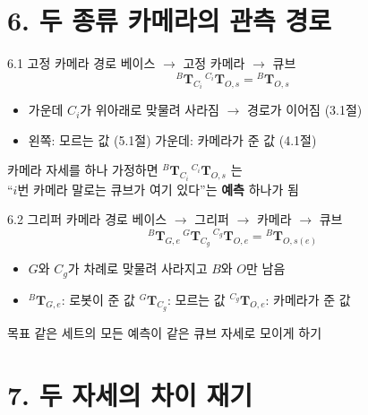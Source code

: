 \documentclass[aspectratio=169,11pt]{beamer}
\newcommand{\T}[3][]{{}^{#2}\mathbf{T}^{#1}_{#3}}   %
\begin{document}
\section{6. 두 종류 카메라의 관측 경로}

\begin{frame}{6.1 고정 카메라 경로}
  베이스 $\rightarrow$ 고정 카메라 $\rightarrow$ 큐브
  \[
    \T{B}{C_i}\,
    \T{C_i}{O,s}
    =
    \T{B}{O,s}
  \]
  \begin{itemize}
    \item 가운데 $C_i$가 위아래로 맞물려 사라짐 $\rightarrow$ 경로가 이어짐 (3.1절)
    \item 왼쪽: 모르는 값 (5.1절) \quad 가운데: 카메라가 준 값 (4.1절)
  \end{itemize}
  \vfill
  \begin{block}{}
    \centering
    카메라 자세를 하나 가정하면 $\T{B}{C_i}\,\T{C_i}{O,s}$ 는\\
    ``$i$번 카메라 말로는 큐브가 여기 있다''는 \textbf{예측} 하나가 됨
  \end{block}
\end{frame}

\begin{frame}{6.2 그리퍼 카메라 경로}
  베이스 $\rightarrow$ 그리퍼 $\rightarrow$ 카메라 $\rightarrow$ 큐브
  \[
    \T{B}{G,e}\,
    \T{G}{C_g}\,
    \T{C_g}{O,e}
    =
    \T{B}{O,s(e)}
  \]
  \begin{itemize}
    \item $G$와 $C_g$가 차례로 맞물려 사라지고 $B$와 $O$만 남음
    \item $\T{B}{G,e}$: 로봇이 준 값 \quad
          $\T{G}{C_g}$: 모르는 값 \quad
          $\T{C_g}{O,e}$: 카메라가 준 값
  \end{itemize}
  \vfill
  \begin{alertblock}{목표}
    같은 세트의 모든 예측이 같은 큐브 자세로 모이게 하기
  \end{alertblock}
\end{frame}

\section{7. 두 자세의 차이 재기}
\end{document}
